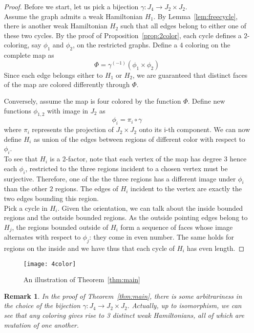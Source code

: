 \documentclass[11pt]{amsart}
\newtheorem{rmk}{Remark}[section]
\begin{document}
\begin{proof}
Before we start, let us pick a bijection $\gamma : J_{4} \rightarrow J_{2}\times J_{2} $.\\
Assume the graph admits a weak Hamiltonian $H_{1}$.
By Lemma~\ref{lem:freecycle}, there is another weak Hamiltonian $H_{2}$ such that all edges belong to either one of these two cycles.
By the proof of Proposition~\ref{prop:2color}, each cycle defines a $2$-coloring, say $\phi_{1}$ and $\phi_{2}$, on the restricted graphs.
Define a $4$ coloring on the complete map as 
$$\Phi= \gamma^{(-1)} (\phi_{1} \times \phi_{2})$$
Since each edge belongs either to $H_{1}$ or $H_{2}$, we are guaranteed that distinct faces of the map are colored differently through $\Phi$.

Conversely, assume the map is four colored by the function $\Phi$.
Define new functions $\phi_{1,2}$ with image in $J_{2}$ as  
$$\phi_{i}=\pi_{i}\circ \gamma$$
where $\pi_{i}$ represents the projection of $J_{2}\times J_{2} $ onto its i-th component.
We can now define $H_{i}$ as union of the edges between regions of different color with respect to $\phi_{i}$. \\
To see that $H_{i}$ is a 2-factor, note that each vertex of the map has degree $3$ hence each $\phi_{i}$, restricted to the three regions incident to a chosen vertex must be surjective.
Therefore, one of the the three regions has a different image under $\phi_{i}$ than the other $2$ regions. 
The edges of $H_{i}$ incident to the vertex are exactly the two edges bounding this region.\\
Pick a cycle in $H_{i}$.
Given the orientation, we can talk about the inside bounded regions and the outside bounded regions.
As the outside pointing edges belong to $H_{j}$, the regions bounded outside of $H_{i}$ form a sequence of faces whose image alternates with respect to $\phi_{j}$: they come in even number.
The same holds for regions on the inside and we have thus that each cycle of $H_{i}$ has even length.
\end{proof}

\begin{figure}[!h]
{\texttt{[image: 4color]}}
\caption{An illustration of Theorem~\ref{thm:main}}
\label{fig:4color}
\end{figure}

\begin{rmk}
\label{rmk:freedom}
In the proof of Theorem~\ref{thm:main}, there is some arbitrariness in the choice of the bijection $\gamma : J_{4} \rightarrow J_{2}\times J_{2} $.
Actually, up to isomorphism, we can see that any coloring gives rise to 3 distinct weak Hamiltonians, all of which are mutation of one another.
\end{rmk}
\end{document}
